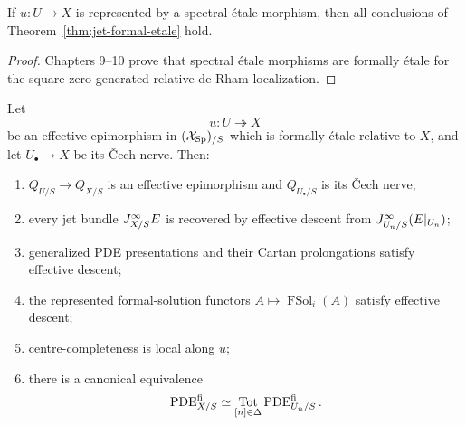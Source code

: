 \begin{corollary}
\label{cor:jet-etale-invariance}
If $u:U\to X$ is represented by a spectral \'{e}tale morphism, then all conclusions of Theorem~\ref{thm:jet-formal-etale} hold.
\end{corollary}

\begin{proof}
Chapters 9--10 prove that spectral \'{e}tale morphisms are formally \'{e}tale for the square-zero-generated relative de Rham localization.
\end{proof}

\begin{theorem}
\label{thm:jet-formal-etale-descent}
Let
\[
    u:U\twoheadrightarrow X
\]
be an effective epimorphism in $(\mathcal{X}_{\mathrm{Sp}})_{/S}$ which is formally \'{e}tale relative to $X$, and let $U_\bullet\to X$ be its \v{C}ech nerve.  Then:
\begin{enumerate}
\item $Q_{U/S}\to Q_{X/S}$ is an effective epimorphism and $Q_{U_\bullet/S}$ is its \v{C}ech nerve;
\item every jet bundle $J^{\infty}_{X/S}E$ is recovered by effective descent from $J^{\infty}_{U_n/S}(E|_{U_n})$;
\item generalized PDE presentations and their Cartan prolongations satisfy effective descent;
\item the represented formal-solution functors $A\mapsto\operatorname{FSol}_i(A)$ satisfy effective descent;
\item centre-completeness is local along $u$;
\item there is a canonical equivalence
\[
    \operatorname{PDE}^{\mathrm{fi}}_{X/S}
    \simeq
    \operatorname*{Tot}_{[n]\in\Delta}
    \operatorname{PDE}^{\mathrm{fi}}_{U_n/S}.
\]
\end{enumerate}
\end{theorem}

